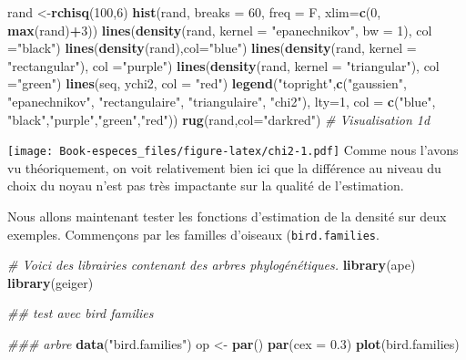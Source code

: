 \documentclass[
]{book}
\newenvironment{Shaded}{\begin{snugshade}}{\end{snugshade}}
\newcommand{\CommentTok}[1]{\textcolor[rgb]{0.56,0.35,0.01}{\textit{#1}}}
\newcommand{\DataTypeTok}[1]{\textcolor[rgb]{0.13,0.29,0.53}{#1}}
\newcommand{\DecValTok}[1]{\textcolor[rgb]{0.00,0.00,0.81}{#1}}
\newcommand{\FloatTok}[1]{\textcolor[rgb]{0.00,0.00,0.81}{#1}}
\newcommand{\KeywordTok}[1]{\textcolor[rgb]{0.13,0.29,0.53}{\textbf{#1}}}
\newcommand{\NormalTok}[1]{#1}
\newcommand{\OperatorTok}[1]{\textcolor[rgb]{0.81,0.36,0.00}{\textbf{#1}}}
\newcommand{\StringTok}[1]{\textcolor[rgb]{0.31,0.60,0.02}{#1}}
\begin{document}
\begin{Shaded}
\begin{Highlighting}[]
\NormalTok{rand <-}\KeywordTok{rchisq}\NormalTok{(}\DecValTok{100}\NormalTok{,}\DecValTok{6}\NormalTok{)}
\KeywordTok{hist}\NormalTok{(rand, }\DataTypeTok{breaks =} \DecValTok{60}\NormalTok{, }\DataTypeTok{freq =}\NormalTok{ F, }\DataTypeTok{xlim=}\KeywordTok{c}\NormalTok{(}\DecValTok{0}\NormalTok{, }\KeywordTok{max}\NormalTok{(rand)}\OperatorTok{+}\DecValTok{3}\NormalTok{))}
\KeywordTok{lines}\NormalTok{(}\KeywordTok{density}\NormalTok{(rand, }\DataTypeTok{kernel =}  \StringTok{"epanechnikov"}\NormalTok{, }\DataTypeTok{bw =} \DecValTok{1}\NormalTok{), }\DataTypeTok{col =}\StringTok{"black"}\NormalTok{)}
\KeywordTok{lines}\NormalTok{(}\KeywordTok{density}\NormalTok{(rand),}\DataTypeTok{col=}\StringTok{"blue"}\NormalTok{)}
\KeywordTok{lines}\NormalTok{(}\KeywordTok{density}\NormalTok{(rand, }\DataTypeTok{kernel =}  \StringTok{"rectangular"}\NormalTok{), }\DataTypeTok{col =}\StringTok{"purple"}\NormalTok{)}
\KeywordTok{lines}\NormalTok{(}\KeywordTok{density}\NormalTok{(rand, }\DataTypeTok{kernel =}  \StringTok{"triangular"}\NormalTok{), }\DataTypeTok{col =}\StringTok{"green"}\NormalTok{)}
\KeywordTok{lines}\NormalTok{(seq, ychi2, }\DataTypeTok{col =} \StringTok{"red"}\NormalTok{)}
\KeywordTok{legend}\NormalTok{(}\StringTok{"topright"}\NormalTok{,}\KeywordTok{c}\NormalTok{(}\StringTok{"gaussien"}\NormalTok{, }\StringTok{"epanechnikov"}\NormalTok{, }\StringTok{"rectangulaire"}\NormalTok{, }\StringTok{"triangulaire"}\NormalTok{, }\StringTok{"chi2"}\NormalTok{),}
       \DataTypeTok{lty=}\DecValTok{1}\NormalTok{, }\DataTypeTok{col =} \KeywordTok{c}\NormalTok{(}\StringTok{"blue"}\NormalTok{, }\StringTok{"black"}\NormalTok{,}\StringTok{"purple"}\NormalTok{,}\StringTok{"green"}\NormalTok{,}\StringTok{"red"}\NormalTok{))}
\KeywordTok{rug}\NormalTok{(rand,}\DataTypeTok{col=}\StringTok{"darkred"}\NormalTok{) }\CommentTok{# Visualisation 1d}
\end{Highlighting}
\end{Shaded}

\texttt{[image: Book-especes\_files/figure-latex/chi2-1.pdf]}
Comme nous l'avons vu théoriquement, on voit relativement bien ici que la différence au niveau du choix du noyau n'est pas très impactante sur la qualité de l'estimation.

Nous allons maintenant tester les fonctions d'estimation de la densité sur deux exemples.
Commençons par les familles d'oiseaux (\texttt{bird.families}.

\begin{Shaded}
\begin{Highlighting}[]
\CommentTok{# Voici des librairies contenant des arbres phylogénétiques.}
\KeywordTok{library}\NormalTok{(ape)}
\KeywordTok{library}\NormalTok{(geiger)}

\CommentTok{## test avec bird families}

\CommentTok{### arbre}
\KeywordTok{data}\NormalTok{(}\StringTok{"bird.families"}\NormalTok{)}
\NormalTok{op <-}\StringTok{ }\KeywordTok{par}\NormalTok{()}
\KeywordTok{par}\NormalTok{(}\DataTypeTok{cex =} \FloatTok{0.3}\NormalTok{)}
\KeywordTok{plot}\NormalTok{(bird.families)}
\end{Highlighting}
\end{Shaded}
\end{document}
